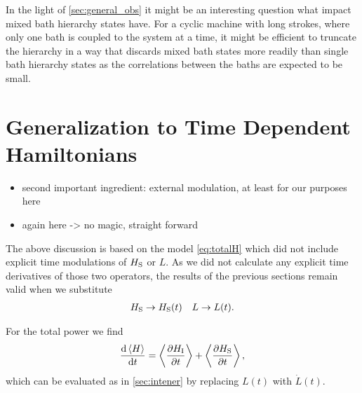 In the light of \cref{sec:general_obs} it might be an interesting
question what impact mixed bath hierarchy states have. For a cyclic
machine with long strokes, where only one bath is coupled to the
system at a time, it might be efficient to truncate the hierarchy in a
way that discards mixed bath states more readily than single bath
hierarchy states as the correlations between the baths are expected to
be small.

\section{Generalization to Time Dependent Hamiltonians}
\label{sec:timedep}
\begin{itemize}
\item second important ingredient: external modulation, at least for
  our purposes here
\item again here -> no magic, straight forward
\end{itemize}

The above discussion is based on the model \cref{eq:totalH} which did
not include explicit time modulations of \(H_{\mathrm{S}}\) or \(L\). As we
did not calculate any explicit time derivatives of those two
operators, the results of the previous sections remain valid when we
substitute
\begin{align}
  \label{eq:timedepsusbs}
  H_{\mathrm{S}}&\rightarrow H_{\mathrm{S}}(t) & L\rightarrow L(t).
\end{align}

For the total power we find
\begin{equation}
  \label{eq:power}
  \dv{\ev{H}}{t} = \ev{\pdv{H_\inter}{t}} + \ev{\pdv{H_\sys}{t}},
\end{equation}
which can be evaluated as in \cref{sec:intener} by replacing \(L(t)\)
with \(\dot{L}(t)\).
